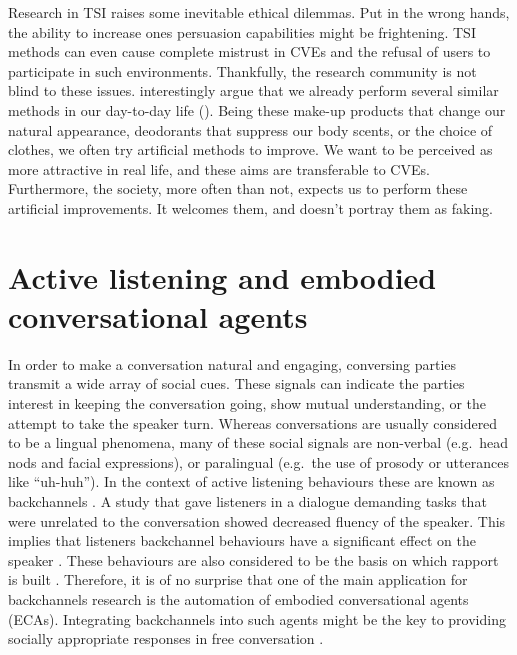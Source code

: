 \documentclass[]{simple-thesis}
\begin{document}
Research in TSI raises some inevitable ethical dilemmas.
Put in the wrong hands, the ability to increase ones persuasion capabilities might be frightening.
TSI methods can even cause complete mistrust in CVEs and the refusal of users to participate in such environments.
Thankfully, the research community is not blind to these issues.
\citeauthor{Bailenson2008} interestingly argue that we already perform several similar methods in our day-to-day life (\citeyear{Bailenson2008}).
Being these make-up products that change our natural appearance, deodorants that suppress our body scents, or the choice of clothes, we often try artificial methods to improve.
We want to be perceived as more attractive in real life, and these aims are transferable to CVEs.
Furthermore, the society, more often than not, expects us to perform these artificial improvements.
It welcomes them, and doesn't portray them as faking.

\section{Active listening and embodied conversational agents}

In order to make a conversation natural and engaging, conversing parties transmit a wide array of social cues.
These signals can indicate the parties interest in keeping the conversation going, show mutual understanding, or the attempt to take the speaker turn.
Whereas conversations are usually considered to be a lingual phenomena, many of these social signals are non-verbal (e.g.\ head nods and facial expressions), or paralingual (e.g.\ the use of prosody or utterances like ``uh-huh'').
In the context of active listening behaviours these are known as backchannels \citep{Yngve1970}.
A study that gave listeners in a dialogue demanding tasks that were unrelated to the conversation showed decreased fluency of the speaker.
This implies that listeners backchannel behaviours have a significant effect on the speaker \citep{Bavelas2000}.
These behaviours are also considered to be the basis on which rapport is built \citep{Tickle-Degnen1990, Gratch2007}.
Therefore, it is of no surprise that one of the main application for backchannels research is the automation of embodied conversational agents (ECAs).
Integrating backchannels into such agents might be the key to providing socially appropriate responses in free conversation \citep{Morency2008, Bevacqua2008}.
\end{document}
